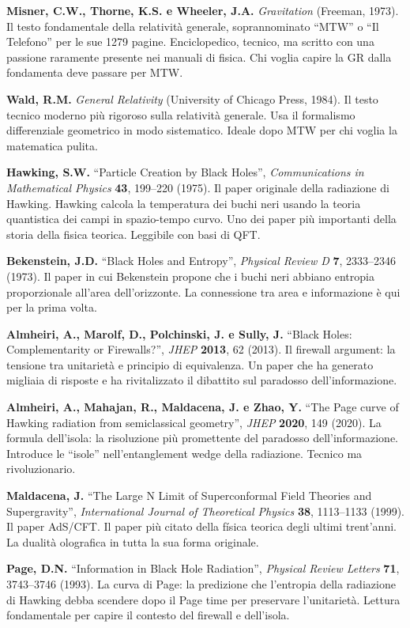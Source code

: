 \documentclass[11.5pt,a4paper,openany]{book}
\theoremstyle{remark}
\begin{document}
\textbf{Misner, C.W., Thorne, K.S. e Wheeler, J.A.} \textit{Gravitation} (Freeman, 1973). Il testo fondamentale della relatività generale, soprannominato ``MTW'' o ``Il Telefono'' per le sue 1279 pagine. Enciclopedico, tecnico, ma scritto con una passione raramente presente nei manuali di fisica. Chi voglia capire la GR dalla fondamenta deve passare per MTW.

\textbf{Wald, R.M.} \textit{General Relativity} (University of Chicago Press, 1984). Il testo tecnico moderno più rigoroso sulla relatività generale. Usa il formalismo differenziale geometrico in modo sistematico. Ideale dopo MTW per chi voglia la matematica pulita.

\textbf{Hawking, S.W.} ``Particle Creation by Black Holes'', \textit{Communications in Mathematical Physics} \textbf{43}, 199--220 (1975). Il paper originale della radiazione di Hawking. Hawking calcola la temperatura dei buchi neri usando la teoria quantistica dei campi in spazio-tempo curvo. Uno dei paper più importanti della storia della fisica teorica. Leggibile con basi di QFT.

\textbf{Bekenstein, J.D.} ``Black Holes and Entropy'', \textit{Physical Review D} \textbf{7}, 2333--2346 (1973). Il paper in cui Bekenstein propone che i buchi neri abbiano entropia proporzionale all'area dell'orizzonte. La connessione tra area e informazione è qui per la prima volta.

\textbf{Almheiri, A., Marolf, D., Polchinski, J. e Sully, J.} ``Black Holes: Complementarity or Firewalls?'', \textit{JHEP} \textbf{2013}, 62 (2013). Il firewall argument: la tensione tra unitarietà e principio di equivalenza. Un paper che ha generato migliaia di risposte e ha rivitalizzato il dibattito sul paradosso dell'informazione.

\textbf{Almheiri, A., Mahajan, R., Maldacena, J. e Zhao, Y.} ``The Page curve of Hawking radiation from semiclassical geometry'', \textit{JHEP} \textbf{2020}, 149 (2020). La formula dell'isola: la risoluzione più promettente del paradosso dell'informazione. Introduce le ``isole'' nell'entanglement wedge della radiazione. Tecnico ma rivoluzionario.

\textbf{Maldacena, J.} ``The Large N Limit of Superconformal Field Theories and Supergravity'', \textit{International Journal of Theoretical Physics} \textbf{38}, 1113--1133 (1999). Il paper AdS/CFT. Il paper più citato della física teorica degli ultimi trent'anni. La dualità olografica in tutta la sua forma originale.

\textbf{Page, D.N.} ``Information in Black Hole Radiation'', \textit{Physical Review Letters} \textbf{71}, 3743--3746 (1993). La curva di Page: la predizione che l'entropia della radiazione di Hawking debba scendere dopo il Page time per preservare l'unitarietà. Lettura fondamentale per capire il contesto del firewall e dell'isola.
\end{document}
